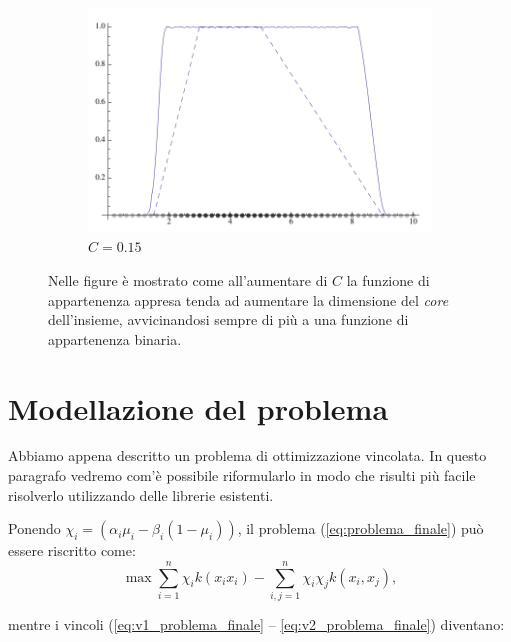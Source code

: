 \documentclass[a4paper,12pt]{report}
\begin{document}
\begin{figure}[h]
\begin{subfigure}[t]{0.32\textwidth}
    \end{subfigure}
    \begin{subfigure}[t]{0.32\textwidth}
        \centering
        \includegraphics[scale=0.18]{images/parametro_C_3.png}
        \caption{$C = 0.15 $}
        \label{fig:C_3}
    \end{subfigure}
    \caption{Nelle figure è mostrato come all'aumentare di $C$ la funzione di appartenenza appresa tenda ad aumentare la dimensione del \textit{core} dell'insieme, avvicinandosi sempre di più a una funzione di appartenenza binaria.}
    \label{fig:parametro_C}
\end{figure}


\section{Modellazione del problema}
Abbiamo appena descritto un problema di ottimizzazione vincolata. In questo paragrafo vedremo com'è possibile riformularlo in modo che risulti più facile risolverlo utilizzando delle librerie esistenti.

\bigskip

\noindent Ponendo $\chi_i = (\alpha_i\mu_i - \beta_i(1-\mu_i))$, il problema (\ref{eq:problema_finale}) può essere riscritto come:
\begin{equation}
    \max \displaystyle\sum_{i=1}^{n}\chi_ik(x_ix_i) -\displaystyle\sum_{i,j=1}^{n}\chi_i\chi_j k(x_i,x_j),
\label{eq:problema_finale_2}
\end{equation}

\noindent mentre i vincoli (\ref{eq:v1_problema_finale} -- \ref{eq:v2_problema_finale}) diventano:
\end{document}
